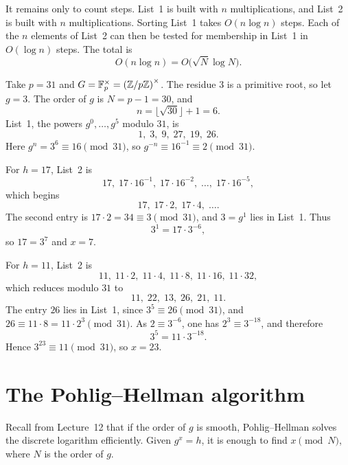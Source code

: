 
It remains only to count steps. List~1 is built with \(n\)
multiplications, and List~2 is built with \(n\) multiplications. Sorting
List~1 takes \(O(n\log n)\) steps. Each of the \(n\) elements of List~2
can then be tested for membership in List~1 in \(O(\log n)\) steps.
The total is
\[
    O(n\log n) = O\bigl(\sqrt{N}\log N\bigr).
\]

\begin{example}
Take \(p=31\) and \(G=\mathbb F_p^\times=\left(\mathbb Z/p\mathbb Z\right)^\times\). The residue \(3\)
is a primitive root, so let \(g=3\). The order of \(g\) is
\(N=p-1=30\), and
\[
    n=\bigl\lfloor\sqrt{30}\bigr\rfloor+1=6.
\]
List~1, the powers \(g^0,\ldots,g^{5}\) modulo \(31\), is
\[
    1,\; 3,\; 9,\; 27,\; 19,\; 26.
\]
Here \(g^n=3^6\equiv 16\pmod{31}\), so \(g^{-n}\equiv 16^{-1}\equiv 2\pmod{31}\).

For \(h=17\), List~2 is
\[
    17,\; 17\cdot 16^{-1},\; 17\cdot 16^{-2},\; \ldots,\; 17\cdot 16^{-5},
\]
which begins
\[
    17,\; 17\cdot 2,\; 17\cdot 4,\; \ldots.
\]
The second entry is \(17\cdot 2=34\equiv 3\pmod{31}\), and \(3=g^1\) lies
in List~1. Thus
\[
    3^1 = 17\cdot 3^{-6},
\]
so \(17=3^7\) and \(x=7\).

For \(h=11\), List~2 is
\[
    11,\; 11\cdot 2,\; 11\cdot 4,\; 11\cdot 8,\; 11\cdot 16,\; 11\cdot 32,
\]
which reduces modulo \(31\) to
\[
    11,\; 22,\; 13,\; 26,\; 21,\; 11.
\]
The entry \(26\) lies in List~1, since \(3^5\equiv 26\pmod{31}\), and
\(26\equiv 11\cdot 8=11\cdot 2^3\pmod{31}\). As \(2\equiv 3^{-6}\), one has
\(2^3\equiv 3^{-18}\), and therefore
\[
    3^5 = 11\cdot 3^{-18}.
\]
Hence \(3^{23}\equiv 11\pmod{31}\), so \(x=23\).
\end{example}


\section{The Pohlig--Hellman algorithm}


Recall from Lecture~12 that if the order of \(g\) is smooth, Pohlig--Hellman solves the discrete logarithm efficiently. Given \(g^x=h\), it is enough
to find \(x\pmod{N}\), where \(N\) is the order of \(g\).

